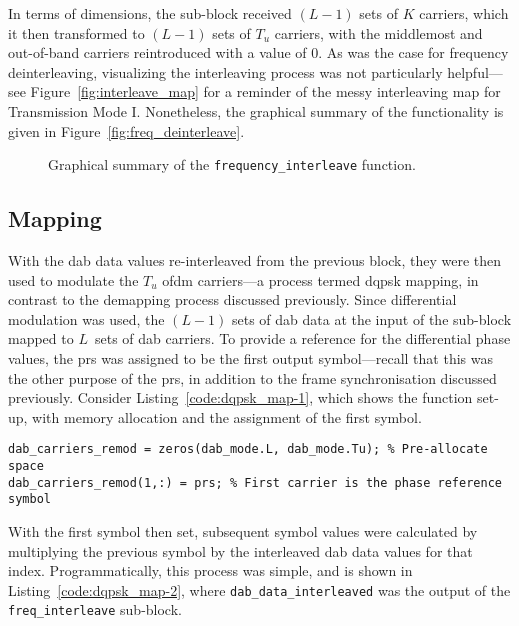 \documentclass[class=report,11pt,crop=false]{standalone}
\begin{document}
In terms of dimensions, the sub-block received \((L-1)\) sets of \(K\) carriers, which it then transformed to \((L-1)\) sets of \(T_u\) carriers, with the middlemost and out-of-band carriers reintroduced with a value of 0. As was the case for frequency deinterleaving, visualizing the interleaving process was not particularly helpful---see Figure~\ref{fig:interleave_map} for a reminder of the messy interleaving map for Transmission Mode I. Nonetheless, the graphical summary of the functionality is given in Figure~\ref{fig:freq_deinterleave}.

\begin{figure}[htbp]
  \centering
  \captionsetup{type=figure}
  \def\svgwidth{\linewidth}
  { %
  }
  \caption{Graphical summary of the \texttt{frequency\_interleave} function.}
  \label{fig:freq_interleave}
\end{figure}

\subsection{ Mapping \label{subsect:dab-proc_dqpsk-map}}
With the \gls{dab} data values re-interleaved from the previous block, they were then used to modulate the \(T_u\) \gls{ofdm} carriers---a process termed \gls{dqpsk} mapping, in contrast to the demapping process discussed previously. Since differential modulation was used, the \((L-1)\) sets of \gls{dab} data at the input of the sub-block mapped to \(L\)~sets of \gls{dab} carriers. To provide a reference for the differential phase values, the \gls{prs} was assigned to be the first output symbol---recall that this was the other purpose of the \gls{prs}, in addition to the frame synchronisation discussed previously. Consider Listing~\ref{code:dqpsk_map-1}, which shows the function set-up, with memory allocation and the assignment of the first symbol.

\begin{lstlisting}[caption={\textsc{Matlab} code for setting up the \texttt{dqpsk\_map} function.},label={code:dqpsk_map-1}]
dab_carriers_remod = zeros(dab_mode.L, dab_mode.Tu); % Pre-allocate space
dab_carriers_remod(1,:) = prs; % First carrier is the phase reference symbol
\end{lstlisting}

With the first symbol then set, subsequent symbol values were calculated by multiplying the previous symbol by the interleaved \gls{dab} data values for that index. Programmatically, this process was simple, and is shown in Listing~\ref{code:dqpsk_map-2}, where \texttt{dab\_data\_interleaved} was the output of the \texttt{freq\_interleave} sub-block.
\end{document}
